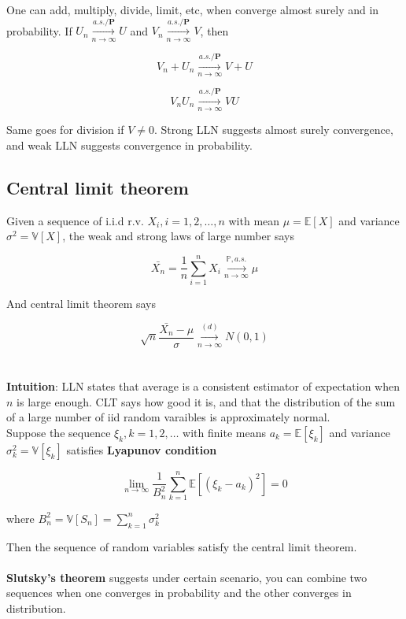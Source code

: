 \documentclass{article}
\begin{document}
One can add, multiply, divide, limit, etc, when converge almost surely and in probability.
If $U_n \overset{a.s./\mathbf{P}}{\underset{n \rightarrow \infty}{\longrightarrow}} U$ and
$V_n \overset{a.s./\mathbf{P}}{\underset{n \rightarrow \infty}{\longrightarrow}} V$, then

$$
V_n + U_n \overset{a.s./\mathbf{P}}{\underset{n \rightarrow \infty}{\longrightarrow}} V + U
$$

$$
V_n U_n \overset{a.s./\mathbf{P}}{\underset{n \rightarrow \infty}{\longrightarrow}} V U
$$

Same goes for division if $V \neq 0$.
Strong LLN suggests almost surely convergence, and weak LLN suggests convergence in probability.

\subsection{Central limit theorem}

Given a sequence of i.i.d r.v. $X_i, i = 1, 2, \dots, n$ with mean $\mu = \mathbb{E}[X]$ and variance $\sigma^2 = \mathbb{V}[X]$, the weak and strong laws of large number says

$$
\bar{X_n} = \frac{1}{n} \sum_{i=1}^{n} X_i \overset{\mathbb{P}, a.s.}{\underset{n \rightarrow \infty}{\longrightarrow}} \mu
$$

And central limit theorem says

$$
\sqrt{n} \frac{\bar{X_n} - \mu}{\sigma} \overset{(d)}{\underset{n \rightarrow \infty}{\longrightarrow}} \mathit{N}(0, 1)
$$
\\
\\

\textbf{Intuition}: LLN states that average is a consistent estimator of expectation when $n$ is large enough.
CLT says how good it is, and that the distribution of the sum of a large number of iid random varaibles is approximately normal.
\\

Suppose the sequence $\xi_k, k = 1, 2, \dots$ with finite means $a_k = \mathbb{E}[\xi_k]$ and variance $\sigma^2_{k} = \mathbb{V}[\xi_k]$ satisfies \textbf{Lyapunov condition}

$$
\lim_{n \to \infty}\frac{1}{B^2_n} \sum_{k = 1}^{n}{\mathbb{E}[(\xi_k - a_k)^2]} = 0
$$

where $B^2_n = \mathbb{V}[S_n] = \sum_{k = 1}^{n}{\sigma_k^2}$

Then the sequence of random variables satisfy the central limit theorem.
\\
\\
\textbf{Slutsky's theorem} suggests under certain scenario, you can combine two sequences when one converges in probability and the other converges in distribution.
\end{document}
